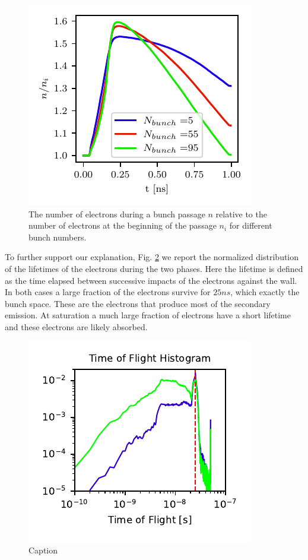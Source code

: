 \begin{figure}
    \centering
    \includegraphics[scale=1.4]{chapters/Chapter1/Figures/nel_timep_sat_overlap.pdf}
    \caption{The number of electrons during a bunch passage $n$ relative to the number of electrons at the beginning of the passage $n_i$ for different bunch numbers.}
    \label{fig:Nel_sat_overlap}
\end{figure}
To further support our explanation, Fig. \ref{fig:lifetime_hist} we report the normalized distribution of the lifetimes of the electrons during the two phases. Here the lifetime is defined as the time elapsed between successive impacts of the electrons against the wall. In both cases a large fraction of the electrons survive for $25ns$, which exactly the bunch space. These are the electrons that produce most of the secondary emission. At saturation a much large fraction of electrons have a short lifetime and these electrons are likely absorbed.

\begin{figure}
    \centering
    \includegraphics[scale=1.4]{chapters/Chapter1/Figures/lifetime_hist.pdf}
    \caption{Caption}
    \label{fig:lifetime_hist}
\end{figure}

